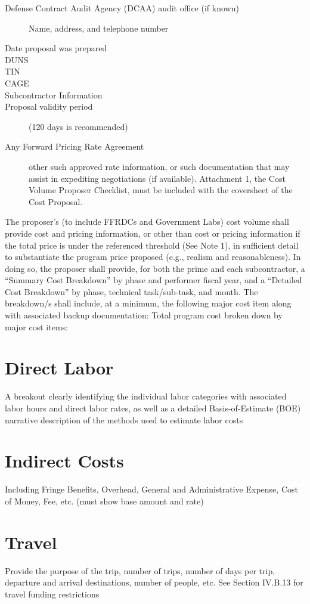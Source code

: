 \begin{description}
\item [Defense Contract Audit Agency (DCAA) audit office (if known)] Name, address, and telephone number
\item [Date proposal was prepared]
\item [DUNS]
\item [TIN]
\item [CAGE]
\item [Subcontractor Information]
\item [Proposal validity period] (120 days is recommended)
\item [Any Forward Pricing Rate Agreement] other such approved rate information, or such documentation that may assist in expediting negotiations (if available).
Attachment 1, the Cost Volume Proposer Checklist, must be included with the coversheet
of the Cost Proposal.
\end{description}
\newpage

The proposer’s (to include FFRDCs and Government Labs) cost volume shall provide cost and
pricing information, or other than cost or pricing information if the total price is under the
referenced threshold (See Note 1), in sufficient detail to substantiate the program price proposed
(e.g., realism and reasonableness). In doing so, the proposer shall provide, for both the prime
and each subcontractor, a “Summary Cost Breakdown” by phase and performer fiscal year,
and a “Detailed Cost Breakdown” by phase, technical task/sub-task, and month. The
breakdown/s shall include, at a minimum, the following major cost item along with associated
backup documentation:
Total program cost broken down by major cost items:

\section{Direct Labor}
A breakout clearly identifying the individual labor categories with associated labor hours and
direct labor rates, as well as a detailed Basis-of-Estimate (BOE) narrative description of the
methods used to estimate labor costs
\section{Indirect Costs}
Including Fringe Benefits, Overhead, General and Administrative Expense, Cost of Money,
Fee, etc. (must show base amount and rate)
\section{Travel}
Provide the purpose of the trip, number of trips, number of days per trip, departure and
arrival destinations, number of people, etc. See Section IV.B.13 for travel funding
restrictions
